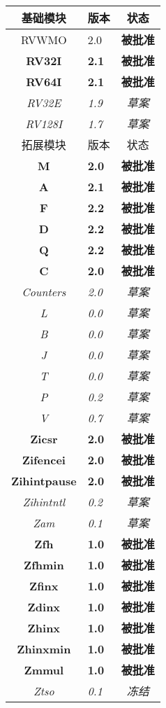 {
\begin{table}[htb]
  \centering
  \begin{tabular}{|c|l|c|}
    \hline
    基础模块       & 版本 & 状态      \\
    \hline
    RVWMO          & 2.0 & \bf 被批准   \\
    \bf RV32I      & \bf 2.1 & \bf 被批准 \\
    \bf RV64I      & \bf 2.1 & \bf 被批准 \\
    \em RV32E      & \em 1.9 & \em 草案 \\
    \em RV128I     & \em 1.7 & \em 草案 \\
    \hline
    拓展模块       & 版本 & 状态 \\
    \hline
    \bf M          & \bf 2.0 & \bf 被批准 \\
    \bf A          & \bf 2.1 & \bf 被批准 \\
    \bf F          & \bf 2.2 & \bf 被批准 \\
    \bf D          & \bf 2.2 & \bf 被批准 \\
    \bf Q          & \bf 2.2 & \bf 被批准 \\
    \bf C          & \bf 2.0 & \bf 被批准 \\
    \em Counters   & \em 2.0 & \em 草案 \\
    \em L          & \em 0.0 & \em 草案 \\
    \em B          & \em 0.0 & \em 草案 \\
    \em J          & \em 0.0 & \em 草案 \\
    \em T          & \em 0.0 & \em 草案 \\
    \em P          & \em 0.2 & \em 草案 \\
    \em V          & \em 0.7 & \em 草案 \\
    \bf Zicsr      & \bf 2.0 & \bf 被批准 \\
    \bf Zifencei   & \bf 2.0 & \bf 被批准 \\
    \bf Zihintpause & \bf 2.0 & \bf 被批准 \\
    \em Zihintntl   & \em 0.2 & \em 草案 \\
    \em Zam        & \em 0.1 & \em 草案 \\
    \bf Zfh        & \bf 1.0 & \bf 被批准 \\
    \bf Zfhmin     & \bf 1.0 & \bf 被批准 \\
    \bf Zfinx      & \bf 1.0 & \bf 被批准 \\
    \bf Zdinx      & \bf 1.0 & \bf 被批准 \\
    \bf Zhinx      & \bf 1.0 & \bf 被批准 \\
    \bf Zhinxmin   & \bf 1.0 & \bf 被批准 \\
    \bf Zmmul      & \bf 1.0 & \bf 被批准 \\
    \em Ztso       & \em 0.1 & \em 冻结 \\
    \hline
  \end{tabular}
\end{table}
}

